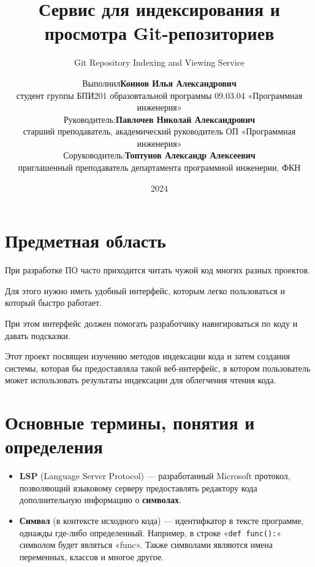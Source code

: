 \documentclass[aspectratio=169,professionalfonts,10pt]{beamer}
\title[Сервис для индексирования и просмотра Git-репозиториев]{Сервис для индексирования и просмотра Git-репозиториев}
\subtitle{Git Repository Indexing and Viewing Service}
\author[Илья Коннов]{
    \begin{tabular}{r l}
        Выполнил
            & \textbf{Коннов Илья Александрович} \\
            & {\scriptsize студент группы БПИ201 образовтальной программы 09.03.04 «Программная инженерия»} \\
        Руководитель:
            & \textbf{Павлочев Николай Александрович} \\
            & {\scriptsize старший преподаватель, академический руководитель ОП «Программная инженерия»} \\
        Соруководитель:
            & \textbf{Топтунов Александр Алексеевич} \\
            & {\scriptsize приглашенный преподаватель департамента программной инженерии, ФКН}
    \end{tabular}
}
\institute[ФКН, ОП «Программная инженерия»]{Факультет компьютерных наук, департамент программной инженерии}
\date{2024}
\begin{document}

\frame[plain]{\titlepage}	%

\section{Предметная область}
\begin{frame}{\insertsection}

При разработке ПО часто приходится читать чужой код многих разных проектов.

Для этого нужно иметь удобный интерфейс, которым легко пользоваться и который быстро работает.

При этом интерфейс должен помогать разработчику навигироваться по коду и давать подсказки.

\hfill

Этот проект посвящен изучению методов индексации кода и затем создания системы, которая бы предоставляла такой веб-интерфейс, в котором пользователь может использовать результаты индексации для облегчения чтения кода.

\end{frame}

\section{Основные термины, понятия и определения}
\begin{frame}{\insertsection}

\begin{itemize}
    \item \textbf{LSP} (Language Server Protocol) \cite{languageserver} — разработанный Microsoft протокол, позволяющий языковому серверу предоставлять редактору кода дополнительную информацию о \textbf{символах}.
    \item \textbf{Символ} (в контексте исходного кода) — идентифкатор в тексте программе, однажды где-либо определенный. Например, в строке «\texttt{def func():}» символом будет являться «func». Также символами являются имена переменных, классов и многое другое.
\end{itemize}

\end{frame}
\end{document}
